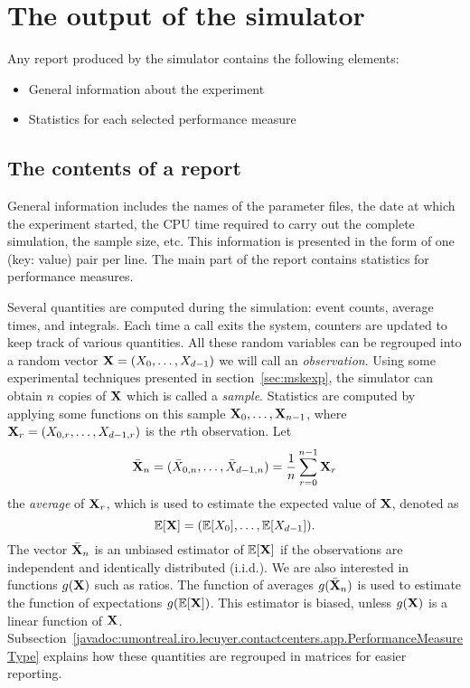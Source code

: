 \section{The output of the simulator}
\label{sec:mskoutput}

Any report produced by the simulator contains the following elements:
\begin{itemize}
\item General information about the experiment
\item Statistics for each selected performance measure
\end{itemize}

\subsection{The contents of a report}

General information includes the names of the parameter files, the
date at which the experiment started, the CPU time required to carry
out the complete simulation, the sample size, etc.  This information
is presented in the form of one (key: value) pair per line.
The main part of the report contains statistics for performance
measures.

Several quantities are computed during the simulation: event
counts, average times, and integrals.  Each time a call exits
the system, counters are updated to keep track of various quantities.
All these random variables can be regrouped into a random vector
$\mathbf{X}=(X_0,\ldots,X_{d-1})$ we will call
an \emph{observation}.  Using some experimental techniques
presented in section~\ref{sec:mskexp}, the simulator can obtain $n$
copies of $\mathbf{X}$ which is called a \emph{sample}.  Statistics are
computed by applying some functions on this sample
$\mathbf{X}_0,\ldots,\mathbf{X}_{n-1}$, where $\mathbf{X}_r=(X_{0, r}, \ldots,
X_{d-1, r})$ is the $r$th observation.
Let
\[\bar{\mathbf{X}}_n=(\bar X_{0, n}, \ldots, \bar X_{d-1, n})=\frac1n\sum_{r=0}^{n-1}\mathbf{X}_r\]
the \emph{average} of $\mathbf{X}_r$,
which is used to estimate the expected value of $\mathbf{X}$, denoted as
\[\mathbb{E}[\mathbf{X}]=(\mathbb{E}[X_0], \ldots, \mathbb{E}[X_{d-1}]).\]
The vector
$\bar{\mathbf{X}}_n$ is an unbiased estimator of $\mathbb{E}[\mathbf{X}]$ if the
observations are independent and identically distributed (i.i.d.).
We are also interested in functions $g(\mathbf{X})$ such as ratios.
The function of averages $g(\bar{\mathbf{X}}_n)$ is used to estimate the
function
of expectations $g(\mathbb{E}[\mathbf{X}])$.  This estimator is biased, unless
$g(\mathbf{X})$ is a linear function of $\mathbf{X}$.
Subsection~\ref{javadoc:umontreal.iro.lecuyer.contactcenters.app.PerformanceMeasureType}
explains how these quantities are regrouped in matrices for easier reporting.

